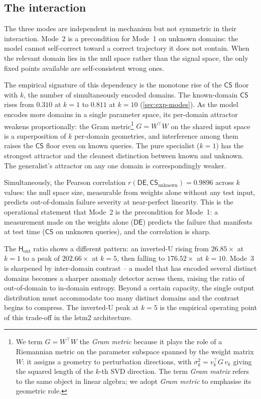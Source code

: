 \documentclass[11pt,a4paper]{article}
\newcommand{\CS}{\mathsf{CS}}
\newcommand{\DE}{\mathsf{DE}}
\newcommand{\Hout}{\mathsf{H}_{\mathrm{out}}}
\begin{document}
\subsection{The interaction}
\label{sec:interaction}

The three modes are independent in mechanism but not symmetric in their interaction. Mode~2 is a precondition for Mode~1 on unknown domains: the model cannot self-correct toward a correct trajectory it does not contain. When the relevant domain lies in the null space rather than the signal space, the only fixed points available are self-consistent wrong ones.

The empirical signature of this dependency is the monotone rise of the $\CS$ floor with $k$, the number of simultaneously encoded domains. The known-domain $\CS$ rises from $0.310$ at $k = 1$ to $0.811$ at $k = 10$ (\ref{sec:exp-modes}). As the model encodes more domains in a single parameter space, its per-domain attractor weakens proportionally: the Gram metric\footnote{We term $G = W^\top W$ the \emph{Gram metric} because it plays the role of a Riemannian metric on the parameter subspace spanned by the weight matrix $W$: it assigns a geometry to perturbation directions, with $\sigma_k^2 = v_k^\top G\, v_k$ giving the squared length of the $k$-th SVD direction. The term \emph{Gram matrix} refers to the same object in linear algebra; we adopt \emph{Gram metric} to emphasise its geometric role.} $G = W^\top W$ on the shared input space is a superposition of $k$ per-domain geometries, and interference among them raises the $\CS$ floor even on known queries. The pure specialist ($k = 1$) has the strongest attractor and the cleanest distinction between known and unknown. The generalist's attractor on any one domain is correspondingly weaker.

Simultaneously, the Pearson correlation $r(\DE, \CS_{\mathrm{unknown}}) = 0.9896$ across $k$ values: the null space size, measurable from weights alone without any test input, predicts out-of-domain failure severity at near-perfect linearity. This is the operational statement that Mode~2 is the precondition for Mode~1: a measurement made on the weights alone ($\DE$) predicts the failure that manifests at test time ($\CS$ on unknown queries), and the correlation is sharp.

The $\Hout$ ratio shows a different pattern: an inverted-U rising from $26.85\times$ at $k = 1$ to a peak of $202.66\times$ at $k = 5$, then falling to $176.52\times$ at $k = 10$. Mode~3 is sharpened by inter-domain contrast -- a model that has encoded several distinct domains becomes a sharper anomaly detector across them, raising the ratio of out-of-domain to in-domain entropy. Beyond a certain capacity, the single output distribution must accommodate too many distinct domains and the contrast begins to compress. The inverted-U peak at $k = 5$ is the empirical operating point of this trade-off in the lstm2 architecture.
\end{document}
